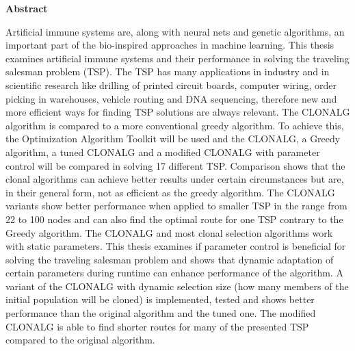 %
%
% 
% 
% 



\cleardoublepage


\begin{center}
{\Large\bfseries Abstract}
\end{center}
Artificial immune systems are, along with neural nets and genetic algorithms, an important part of the bio-inspired approaches in machine learning. This thesis examines artificial immune systems and their performance in solving the traveling salesman problem (TSP). The TSP has many applications in industry and in scientific research like drilling of printed circuit boards, computer wiring, order picking in warehouses, vehicle routing and DNA sequencing, therefore new and more efficient ways for finding TSP solutions are always relevant. The CLONALG algorithm is compared to a more conventional greedy algorithm. To achieve this, the Optimization Algorithm Toolkit will be used and the CLONALG, a Greedy algorithm, a tuned CLONALG and a modified CLONALG with parameter control will be compared in solving 17 different TSP. Comparison shows that the clonal algorithms can achieve better results under certain circumstances but are, in their general form, not as efficient as the greedy algorithm. The CLONALG variants show better performance when applied to smaller TSP in the range from 22 to 100 nodes and can also find the optimal route for one TSP contrary to the Greedy algorithm. The CLONALG and most clonal selection algorithms work with static parameters. This thesis examines if parameter control is beneficial for solving the traveling salesman problem and shows that dynamic adaptation of certain parameters during runtime can enhance performance of the algorithm. A variant of the CLONALG with dynamic selection size (how many members of the initial population will be cloned) is implemented, tested and shows better performance than the original algorithm and the tuned one. The modified CLONALG is able to find shorter routes for many of the presented TSP compared to the original algorithm.

